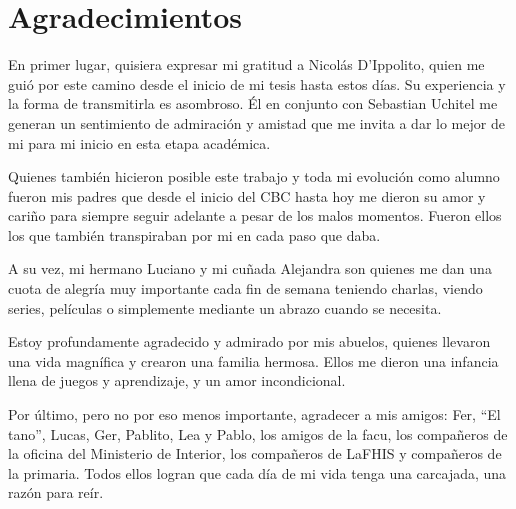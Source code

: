 \chapter*{Agradecimientos}

En primer lugar, quisiera expresar mi gratitud a Nicolás D'Ippolito, quien me guió por este camino desde el inicio de mi
tesis hasta estos días. Su experiencia y la forma de transmitirla es asombroso. Él en conjunto con Sebastian Uchitel me
generan un sentimiento de admiración y amistad que me invita a dar lo mejor de mi para mi inicio en esta etapa
académica.

Quienes también hicieron posible este trabajo y toda mi evolución como alumno fueron mis padres que desde el inicio del
CBC hasta hoy me dieron su amor y cariño para siempre seguir adelante a pesar de los malos momentos. Fueron ellos los
que también transpiraban por mi en cada paso que daba.

A su vez, mi hermano Luciano y mi cuñada Alejandra son quienes me dan una cuota de alegría muy importante cada fin de
semana teniendo charlas, viendo series, películas o simplemente mediante un abrazo cuando se necesita.

Estoy profundamente agradecido y admirado por mis abuelos, quienes llevaron una vida magnífica y crearon una familia
hermosa. Ellos me dieron una infancia llena de juegos y aprendizaje, y un amor incondicional.

Por último, pero no por eso menos importante, agradecer a mis amigos: Fer, ``El tano'', Lucas, Ger, Pablito, Lea y
Pablo, los amigos de la facu, los compañeros de la oficina del Ministerio de Interior, los compañeros de LaFHIS y
compañeros de la primaria. Todos ellos logran que cada día de mi vida tenga una carcajada, una razón para reír.





